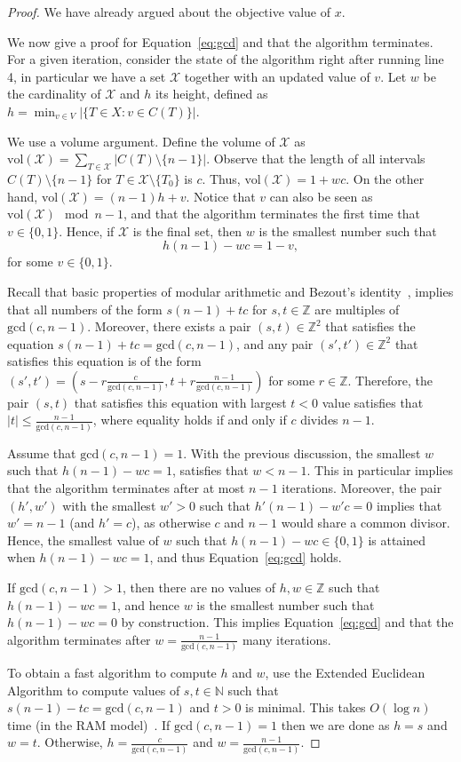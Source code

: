 \documentclass[11pt]{article}
\newcommand{\X}{\mathcal{X}}
\newcommand\+{\mkern2mu}
\newcommand{\T}{T}
\begin{document}
\begin{proof}
We have already argued about the objective value of $x$. 

We now give a proof for Equation~\eqref{eq:gcd} and that the algorithm terminates. For a given iteration, consider the state of the algorithm right after running line 4, in particular we have a set $\X$ together with an updated value of $v$. Let $w$ be  the cardinality of $\X$ and $h$ its height, defined as $h=\min_{v\in V} |\{T\in X: v\in C(T)\}|$. 

We use a volume argument. Define the volume of $\X$ as $\text{vol}(\X)= \sum_{\T \in \X} |C(\T)\setminus\{n-1\}|$. Observe that the length of all intervals $C(\T)\setminus \{n-1\}$ for $\T\in \X\setminus \{T_0\}$ is $c$. Thus,
$
\text{vol}(\X) = 1 + wc. 
$
On the other hand, $\text{vol}(\X) = (n-1)h + v$. Notice that $v$ can also be seen as $\text{vol}(\X) \mod n-1$, and that the algorithm terminates the first time that $v\in\{0,1\}$. Hence, if $\X$ is the final set, then $w$ is the smallest number such that 
$$ h(n-1)- wc =1 - v,$$
for some $v\in \{0,1\}$. 

Recall that basic properties of modular arithmetic and Bezout's identity~\cite{bezout1779theorie}, implies that all numbers of the form $s(n-1) + tc$ for $s,t\in \mathbb{Z}$ are multiples of $\text{gcd}(c,n-1)$. Moreover, there exists a pair $(s,t)\in \mathbb{Z}^2$ that satisfies the equation $s(n-1) + tc= \text{gcd}(c,n-1)$, and any pair $(s',t')\in \mathbb{Z}^2$ that satisfies this equation is of the form $(s',t')=(s-r\frac{c}{\text{gcd}(c,n-1)},t+r\frac{n-1}{\text{gcd}(c,n-1)})$ for some $r\in \mathbb{Z}$. Therefore, the pair $(s,t)$ that satisfies this equation with largest $t<0$ value satisfies that $|t| \le \frac{n-1}{\text{gcd}(c,n-1)}$, where equality holds if and only if $c$ divides $n-1.$ 

Assume that $\text{gcd}(c,n-1)=1$. With the previous discussion, the smallest $w$ such that $h(n-1)- wc =1$, satisfies that $w< n-1$. This in particular implies that the algorithm terminates after at most $n-1$ iterations. Moreover, the pair $(h',w')$ with the smallest $w'> 0$ such that $h'(n-1)- w'c =0$ implies that $w'=n-1$ (and $h'=c$), as otherwise $c$ and $n-1$ would share a common divisor. Hence, the smallest value of $w$ such that $h(n-1)-wc\in \{0,1\}$ is attained when $h(n-1)-wc=1$, and thus Equation~\eqref{eq:gcd} holds. 

If $\text{gcd}(c,n-1)>1$, then there are no values of $h,w\in \mathbb{Z}$ such that $h(n-1)-wc=1$, and hence $w$ is the smallest number such that $h(n-1)-wc=0$ by construction. This implies Equation~\eqref{eq:gcd} and that the algorithm terminates after $w=\frac{n-1}{\text{gcd}(c,n-1)}$ many iterations.

To obtain a fast algorithm to compute $h$ and $w$, use the Extended Euclidean Algorithm to compute values of $s,t\in \mathbb{N}$ such that $s(n-1)-tc = \text{gcd}(c,n-1)$ and $t>0$ is minimal. This  takes $O(\log n)$ time (in the RAM model)~\cite[Chapter 31]{cormen_introduction_2009}. If $\text{gcd}(c,n-1)=1$ then we are done as $h=s$ and $w=t$. Otherwise, $h=\frac{c}{\text{gcd}(c,n-1)}$ and $w=\frac{n-1}{\text{gcd}(c,n-1)}$.
\end{proof}
\end{document}
